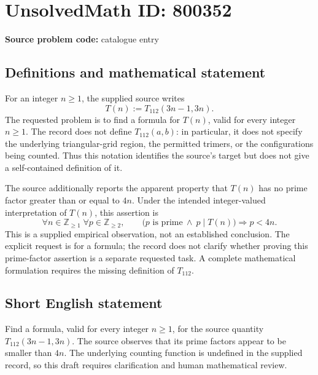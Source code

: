 \documentclass[11pt]{article}
\newcommand{\Z}{\mathbb{Z}}
\begin{document}
\section*{UnsolvedMath ID: 800352}
\textbf{Source problem code:} catalogue entry
\subsection{Definitions and mathematical statement}
For an integer \(n\geq 1\), the supplied source writes
\[
T(n):=T_{112}(3n-1,3n).
\]
The requested problem is to find a formula for \(T(n)\), valid for every integer \(n\geq 1\). The record does not define \(T_{112}(a,b)\): in particular, it does not specify the underlying triangular-grid region, the permitted trimers, or the configurations being counted. Thus this notation identifies the source's target but does not give a self-contained definition of it.

The source additionally reports the apparent property that \(T(n)\) has no prime factor greater than or equal to \(4n\). Under the intended integer-valued interpretation of \(T(n)\), this assertion is
\[
\forall n\in\Z_{\geq 1}\;\forall p\in\Z_{\geq 2},\qquad
\bigl(p\text{ is prime}\ \land\ p\mid T(n)\bigr)\Longrightarrow p<4n.
\]
This is a supplied empirical observation, not an established conclusion. The explicit request is for a formula; the record does not clarify whether proving this prime-factor assertion is a separate requested task. A complete mathematical formulation requires the missing definition of \(T_{112}\).
\subsection{Short English statement}
Find a formula, valid for every integer \(n\geq 1\), for the source quantity \(T_{112}(3n-1,3n)\). The source observes that its prime factors appear to be smaller than \(4n\). The underlying counting function is undefined in the supplied record, so this draft requires clarification and human mathematical review.
\end{document}
